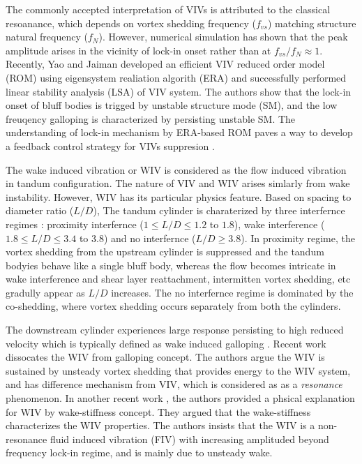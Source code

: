 The commonly accepted interpretation of VIVs is attributed to the classical resoanance, which depends on 
vortex shedding frequency ($f_{vs}$) matching structure natural frequency ($f_N$). However, numerical simulation has shown that 
the peak amplitude arises in the vicinity of lock-in onset rather than at $f_{vs}/f_N \approx 1$. Recently, Yao and Jaiman \cite{yao_jfm_1} 
developed an efficient VIV reduced order model (ROM) using eigensystem realiation algorith (ERA) and successfully performed
linear stability analysis (LSA) of VIV system. 
The authors show that the lock-in onset of bluff bodies is trigged by unstable structure mode (SM), and 
the low freuqency galloping is characterized by persisting unstable SM. The understanding of lock-in mechanism by ERA-based ROM 
paves a way to develop a feedback control strategy for VIVs suppresion \cite{yao_jfm_2}. 


The wake induced vibration or WIV is considered as the flow induced vibration in tandum 
configuration. The nature of VIV and WIV arises simlarly from wake instability. However, WIV has its particular physics 
feature. Based on spacing to diameter ratio ($L/D$), The tandum cylinder is charaterized by 
three interfernce regimes \cite{Mysa2016,ZDRAVKOVICH1987239,1981323}: proximity interfernce ($1 \le L/D \le 1.2$ to $1.8$), 
wake interference ($1.8 \le L/D \le 3.4$ to $3.8$) and no interfernce ($L/D \ge 3.8$).
In proximity regime, the vortex shedding
from the upstream cylinder is suppressed and the tandum bodyies behave like a single bluff body, whereas the flow becomes intricate 
in wake interference and shear layer reattachment, intermitten vortex shedding, etc gradully appear as $L/D$ increases. 
The no interfernce regime is dominated by the co-shedding, where vortex shedding occurs separately from both the cylinders.


The downstream cylinder experiences large response persisting to high reduced velocity 
which is typically defined as wake induced galloping \cite{bokaian1984}. Recent work 
\cite{assi2010} dissocates the WIV from galloping concept. The authors argue the WIV is 
sustained by unsteady vortex shedding that provides energy to the WIV system, 
and has difference mechanism from VIV, which is considered as 
as a \textit{resonance} phenomenon. In another recent work \cite{assi2013}, the authors provided a 
phsical explanation for WIV by wake-stiffness concept. They argued that the wake-stiffness characterizes the 
WIV properties. The authors \cite{assi2010,assi2013} insists that the WIV is a non-resonance 
fluid induced vibration (FIV) with increasing amplituded beyond frequency lock-in regime, and is mainly due to 
unsteady wake. 
%


